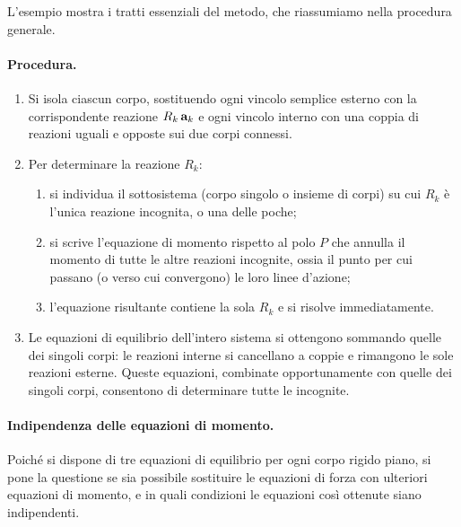 L'esempio mostra i tratti essenziali del metodo, che riassumiamo nella
procedura generale.

\paragraph{Procedura.}
\begin{enumerate}[label=(\arabic*), leftmargin=*,
	itemsep=4pt]
	
	\item{} Si isola ciascun corpo, sostituendo ogni vincolo semplice
	esterno con la corrispondente reazione $R_k\,\mathbf{a}_k$ e ogni
	vincolo interno con una coppia di reazioni uguali e
	opposte sui due corpi connessi.
	
	\item Per determinare la reazione $R_k$:
	\begin{enumerate}[label=(\alph*),
		leftmargin=*, itemsep=2pt]
		\item si individua il sottosistema (corpo singolo
		o insieme di corpi) su cui $R_k$ è l'unica reazione
		incognita, o una delle poche;
		\item si scrive l'equazione di momento rispetto al
		polo $P$ che annulla il momento di tutte le altre
		reazioni incognite, ossia il punto per cui passano
		(o verso cui convergono) le loro linee d'azione;
		\item l'equazione risultante contiene la sola $R_k$
		e si risolve immediatamente.
	\end{enumerate}
	
	\item Le equazioni di equilibrio dell'intero sistema si ottengono
	sommando quelle dei singoli corpi: le reazioni interne si
	cancellano a coppie e rimangono le sole reazioni esterne.
	Queste equazioni, combinate opportunamente con quelle dei
	singoli corpi, consentono di determinare tutte le incognite.
	
\end{enumerate}


\paragraph{Indipendenza delle equazioni di momento.}
Poiché si dispone di tre equazioni di equilibrio per ogni
corpo rigido piano, si pone la questione se sia possibile
sostituire le equazioni di forza con ulteriori equazioni di
momento, e in quali condizioni le equazioni così ottenute
siano indipendenti.


